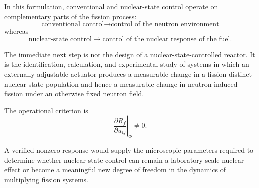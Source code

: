 In this formulation, conventional and nuclear-state control operate on complementary parts of the fission process:
\begin{equation}
\boxed{
\text{conventional control}
\rightarrow
\text{control of the neutron environment}
}
\end{equation}
whereas
\begin{equation}
\boxed{
\text{nuclear-state control}
\rightarrow
\text{control of the nuclear response of the fuel}.
}
\end{equation}

The immediate next step is not the design of a nuclear-state-controlled reactor. It is the identification, calculation, and experimental study of systems in which an externally adjustable actuator produces a measurable change in a fission-distinct nuclear-state population and hence a measurable change in neutron-induced fission under an otherwise fixed neutron field.

The operational criterion is
\begin{equation}
\boxed{
\left.
\frac{\partial R_f}
{\partial u_Q}
\right|_{\Phi}
\neq0.
}
\end{equation}

A verified nonzero response would supply the microscopic parameters required to determine whether nuclear-state control can remain a laboratory-scale nuclear effect or become a meaningful new degree of freedom in the dynamics of multiplying fission systems.
